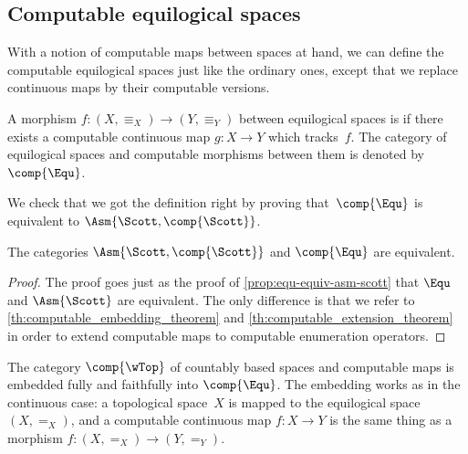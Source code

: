 
\subsection{Computable equilogical spaces}
\label{sec:computable-equ}


With a notion of computable maps between spaces at hand, we can define
the computable equilogical spaces just like the ordinary ones, except
that we replace continuous maps by their computable versions.

\begin{definition}
  \label{def:computable-equ}%
  A morphism $f : (X, {\equiv_X}) \to (Y, {\equiv_Y})$ between
  equilogical spaces is  if there exists a computable
  continuous map $g : X \to Y$ which tracks~$f$.
  The category of equilogical spaces and computable morphisms between
  them is denoted by $\comp{\Equ}$.
\end{definition}

We check that we got the definition right by proving
that~$\comp{\Equ}$ is equivalent to $\Asm{\Scott, \comp{\Scott}}$.

\begin{proposition}
  \label{th:equivalence_compEqu_AsmScott}%
  The categories $\Asm{\Scott, \comp{\Scott}}$ and $\comp{\Equ}$ are
  equivalent.
\end{proposition}

\begin{proof}
  The proof goes just as the proof of
  \cref{prop:equ-equiv-asm-scott} that $\Equ$ and
  $\Asm{\Scott}$ are equivalent. The only difference is that we refer
  to \cref{th:computable_embedding_theorem} and \cref{th:computable_extension_theorem} in order to
  extend computable maps to computable enumeration operators.
\end{proof}

The category $\comp{\wTop}$ of countably based spaces and computable
maps is embedded fully and faithfully into $\comp{\Equ}$. The
embedding works as in the continuous case: a topological space~$X$ is
mapped to the equilogical space $(X, {=_X})$, and a computable
continuous map $f : X \to Y$ is the same thing as a morphism $f : (X,
{=_X}) \to (Y, {=_Y})$.


